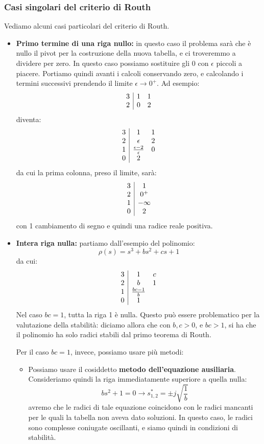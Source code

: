 \documentclass[a4paper,11pt]{article}
\begin{document}
\subsubsection{Casi singolari del criterio di Routh}
Vediamo alcuni casi particolari del criterio di Routh.
\begin{itemize}
\item \textbf{Primo termine di una riga nullo:} in questo caso il problema sarà che è nullo il pivot per la costruzione della nuova tabella, e ci troveremmo a dividere per zero.
In questo caso possiamo sostituire gli 0 con $\epsilon$ piccoli a piacere.
Portiamo quindi avanti i calcoli conservando zero, e calcolando i termini successivi prendendo il limite $\epsilon \rightarrow 0^+$.
Ad esempio:
$$
\begin{array}{c | c c}
	3 & 1 & 1 \\
	2 & 0 & 2
\end{array}
$$
diventa:
$$
\begin{array}{c | c c}
	3 & 1 & 1 \\
	2 & \epsilon & 2 \\
	1 & \frac{\epsilon - 2}{\epsilon} & 0 \\
	0 & 2
\end{array}
$$
da cui la prima colonna, preso il limite, sarà:
$$
\begin{array}{c | c}
	3 & 1 \\
	2 & 0^+ \\
	1 & - \infty \\
	0 & 2
\end{array}
$$
con 1 cambiamento di segno e quindi una radice reale positiva.

\item \textbf{Intera riga nulla:} partiamo dall'esempio del polinomio:
$$
\rho(s) = s^3 + bs^2 + cs + 1
$$
da cui:
$$
\begin{array}{c | c c}
	3 & 1 & c \\
	2 & b & 1 \\
	1 & \frac{bc - 1}{b} \\
	0 & 1
\end{array}
$$
Nel caso $bc = 1$, tutta la riga 1 è nulla.
Questo può essere problematico per la valutazione della stabilità: diciamo allora che con $b, c > 0$, e $bc > 1$, si ha che il polinomio ha solo radici stabili dal primo teorema di Routh.

Per il caso $bc = 1$, invece, possiamo usare più metodi:
\begin{itemize}
	\item Possiamo usare il cosiddetto \textbf{metodo dell'equazione ausiliaria}.
Consideriamo quindi la riga immediatamente superiore a quella nulla:
$$
bs^2 + 1 = 0 \rightarrow s^*_{1, 2} = \pm j \sqrt{ \frac{1}{b} }
$$
avremo che le radici di tale equazione coincidono con le radici mancanti per le quali la tabella non aveva dato soluzioni.
In questo caso, le radici sono complesse coniugate oscillanti, e siamo quindi in condizioni di stabilità.


\end{itemize}
\end{itemize}
\end{document}

